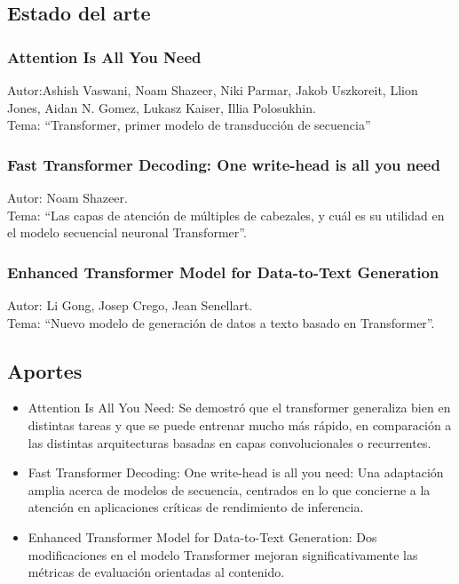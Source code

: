 \documentclass[10pt,twocolumn]{article}
\theoremstyle{definition}
\begin{document}
\subsection{Estado del arte}
\subsubsection{Attention Is All You Need}
Autor:Ashish Vaswani, Noam Shazeer, Niki Parmar, Jakob Uszkoreit, Llion Jones, Aidan N. Gomez, Lukasz Kaiser, Illia Polosukhin.\\ 
Tema: “Transformer, primer modelo de transducción de secuencia”
\subsubsection{Fast Transformer Decoding: One write-head is all you need}
Autor: Noam Shazeer. \\
Tema: “Las capas de atención de múltiples de cabezales, y cuál es su utilidad en el modelo secuencial neuronal Transformer”.
\subsubsection{Enhanced Transformer Model for Data-to-Text Generation}
Autor: Li Gong, Josep Crego, Jean Senellart. \\
Tema: “Nuevo modelo de generación de datos a texto basado en Transformer”.

\subsection{Aportes }
\begin{itemize}
    \item Attention Is All You Need: Se demostró que el transformer generaliza bien en distintas tareas y que se puede entrenar mucho más rápido, en comparación a las distintas arquitecturas basadas en capas convolucionales o recurrentes.

    \item Fast Transformer Decoding: One write-head is all you need: Una adaptación amplia acerca de modelos de secuencia, centrados en lo que concierne a la atención  en aplicaciones críticas de rendimiento de inferencia.

    \item Enhanced Transformer Model for Data-to-Text Generation: Dos modificaciones en el modelo Transformer mejoran significativamente las métricas de evaluación orientadas al contenido.   

\end{itemize}
\end{document}
